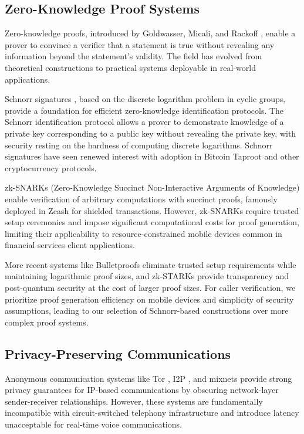 \documentclass[11pt,twocolumn]{article}
\begin{document}
\subsection{Zero-Knowledge Proof Systems}

Zero-knowledge proofs, introduced by Goldwasser, Micali, and Rackoff \cite{goldwasser1989}, enable a prover to convince a verifier that a statement is true without revealing any information beyond the statement's validity. The field has evolved from theoretical constructions to practical systems deployable in real-world applications.

Schnorr signatures \cite{schnorr1991}, based on the discrete logarithm problem in cyclic groups, provide a foundation for efficient zero-knowledge identification protocols. The Schnorr identification protocol allows a prover to demonstrate knowledge of a private key corresponding to a public key without revealing the private key, with security resting on the hardness of computing discrete logarithms. Schnorr signatures have seen renewed interest with adoption in Bitcoin Taproot \cite{nick2021} and other cryptocurrency protocols.

zk-SNARKs (Zero-Knowledge Succinct Non-Interactive Arguments of Knowledge) \cite{bitansky2012} enable verification of arbitrary computations with succinct proofs, famously deployed in Zcash \cite{sasson2014} for shielded transactions. However, zk-SNARKs require trusted setup ceremonies and impose significant computational costs for proof generation, limiting their applicability to resource-constrained mobile devices common in financial services client applications.

More recent systems like Bulletproofs \cite{bunz2018} eliminate trusted setup requirements while maintaining logarithmic proof sizes, and zk-STARKs \cite{bensasson2018} provide transparency and post-quantum security at the cost of larger proof sizes. For caller verification, we prioritize proof generation efficiency on mobile devices and simplicity of security assumptions, leading to our selection of Schnorr-based constructions over more complex proof systems.

\subsection{Privacy-Preserving Communications}

Anonymous communication systems like Tor \cite{dingledine2004}, I2P \cite{zantout2011}, and mixnets \cite{chaum1981} provide strong privacy guarantees for IP-based communications by obscuring network-layer sender-receiver relationships. However, these systems are fundamentally incompatible with circuit-switched telephony infrastructure and introduce latency unacceptable for real-time voice communications.
\end{document}
